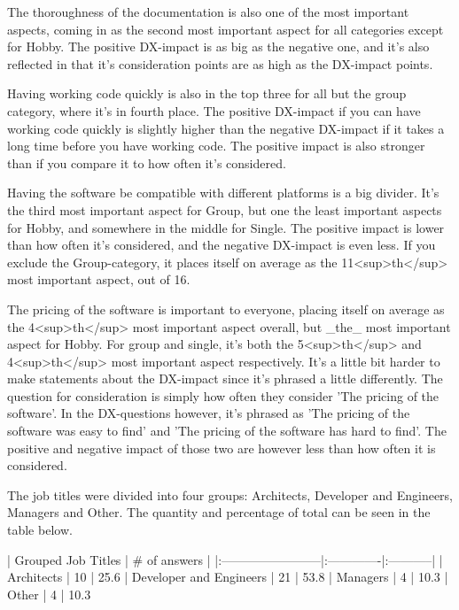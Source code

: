 \documentclass[11pt]{article}
\begin{document}
\begin{multicols}{2}
    The thoroughness of the documentation is also one of the most important
    aspects, coming in as the second most important aspect for all
    categories except for Hobby. The positive DX-impact is as big as the
    negative one, and it's also reflected in that it's consideration points
    are as high as the DX-impact points.

    Having working code quickly is also in the top three for all but the
    group category, where it's in fourth place. The positive DX-impact if
    you can have working code quickly is slightly higher than the negative
    DX-impact if it takes a long time before you have working code. The
    positive impact is also stronger than if you compare it to how often
    it's considered.

    Having the software be compatible with different platforms is a big
    divider. It's the third most important aspect for Group, but one the
    least important aspects for Hobby, and somewhere in the middle for
    Single. The positive impact is lower than how often it's considered, and
    the negative DX-impact is even less. If you exclude the Group-category,
    it places itself on average as the 11<sup>th</sup> most important
    aspect, out of 16.

    The pricing of the software is important to everyone, placing itself on
    average as the 4<sup>th</sup> most important aspect overall, but _the_
    most important aspect for Hobby. For group and single, it's both the
    5<sup>th</sup> and 4<sup>th</sup> most important aspect respectively.
    It's a little bit harder to make statements about the DX-impact since
    it's phrased a little differently. The question for consideration is
    simply how often they consider 'The pricing of the software'. In the
    DX-questions however, it's phrased as 'The pricing of the software was
    easy to find' and 'The pricing of the software has hard to find'. The
    positive and negative impact of those two are however less than how
    often it is considered.


    The job titles were divided into four groups: Architects, Developer and
    Engineers, Managers and Other. The quantity and percentage of total can
    be seen in the table below.

    |   Grouped Job Titles    | # of answers | %
    |:------------------------|:-------------|:-----------|
    | Architects              | 10           | 25.6%
    | Developer and Engineers | 21           | 53.8%
    | Managers                | 4            | 10.3%
    | Other                   | 4            | 10.3%


\end{multicols}
\end{document}
